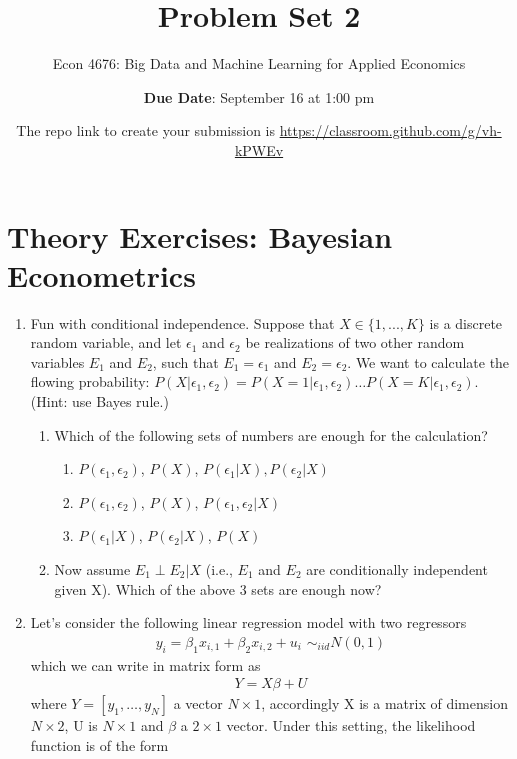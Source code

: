 \documentclass[12pt,onecolumn]{article}
\title{Problem Set 2}
\subtitle{Econ 4676: Big Data and Machine Learning for Applied Economics}
\author{{\bf Due Date}: September 16 at 1:00 pm}
\date{}
\date{The repo link to create your submission is \url{https://classroom.github.com/g/vh-kPWEv}}
\begin{document}
\maketitle

\section{Theory Exercises: Bayesian Econometrics}

\begin{enumerate}

\item Fun with conditional independence.  Suppose that $X\in \{1,...,K\} $ is a discrete random variable, and let $\epsilon_1$ and $\epsilon_2$ be realizations of two other random variables $E_1$ and $E_2$, such that $E_1=\epsilon_1$ and $E_2=\epsilon_2$. We want to calculate the flowing probability: $P(X|\epsilon_1,\epsilon_2)= P(X=1|\epsilon_1,\epsilon_2)\dots  P(X=K|\epsilon_1,\epsilon_2)$. (Hint: use Bayes rule.)
  \begin{enumerate}
  \item Which of the following sets of numbers are enough for the calculation?
  \begin{enumerate}
    \item $P(\epsilon_1,\epsilon_2)$, $P(X)$, $P(\epsilon_1|X), P(\epsilon_2|X)$
    \item $P(\epsilon_1,\epsilon_2)$, $P(X)$, $P(\epsilon_1,\epsilon_2|X)$ 
    \item $P(\epsilon_1|X)$, $P(\epsilon_2|X)$, $P(X)$
    \end{enumerate}
    \item Now  assume $E_1 \perp E_2|X$ (i.e., $E_1$ and $E_2$ are conditionally independent given X). Which of the above 3 sets are enough now?
  \end{enumerate}



  \item Let's consider the following linear regression model with two regressors 
  \begin{align}\label{eq:model}
  y_i = \beta_1 x_{i,1} +\beta_2 x_{i,2} + u_i \,\, \sim_{iid} N(0,1)
  \end{align}
  which we can write in matrix form as 
  \begin{align}
  Y= X\beta + U
  \end{align}
  where $Y=[y_1,\dots,y_N]$ a vector $N\times1$, accordingly X is a matrix of dimension $N\times2$, U is $N\times1$ and $\beta$ a $2\times1$ vector. Under this setting, the likelihood function is of the form
  

\end{enumerate}
\end{document}
